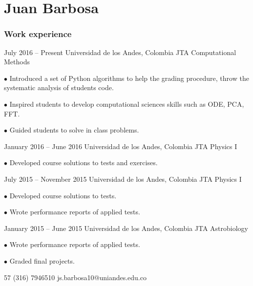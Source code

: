 \documentclass{tccv}
\begin{document}
\part{Juan Barbosa}

\section{Work experience}

\begin{eventlist}
\item{July 2016 -- Present}
     {Universidad de los Andes, Colombia}
     {JTA Computational Methods}
     
     \setlength{\leftskip}{0.5cm}
	     $\bullet$ \hspace{0.2cm} Introduced a set of Python algorithms to help the grading procedure, throw the systematic analysis of students code.
	     
	     $\bullet$ \hspace{0.2cm} Inspired students to develop computational sciences skills such as ODE, PCA, FFT.
     
	     $\bullet$ \hspace{0.2cm} Guided students to solve in class problems.
	     
	     \hrulefill
     \setlength{\leftskip}{0pt}   
	 
\item{January 2016 -- June 2016}
     {Universidad de los Andes, Colombia}
     {JTA Physics I}

	 \setlength{\leftskip}{0.5cm}
		 $\bullet$ \hspace{0.2cm} Developed course solutions to tests and exercises.
		 
		 \hrulefill
	 \setlength{\leftskip}{0pt} 

\item{July 2015 -- November 2015}
     {Universidad de los Andes, Colombia}
     {JTA Physics I}
     
	 \setlength{\leftskip}{0.5cm}
		 $\bullet$ \hspace{0.2cm} Developed course solutions to tests.
		 
		 $\bullet$ \hspace{0.2cm} Wrote performance reports of applied tests.
		 
		 \hrulefill
	 \setlength{\leftskip}{0pt}

\item{January 2015 -- June 2015}
     {Universidad de los Andes, Colombia}
     {JTA Astrobiology}
     
     \setlength{\leftskip}{0.5cm}     
	     $\bullet$ \hspace{0.2cm} Wrote performance reports of applied tests.
	     
	     $\bullet$ \hspace{0.2cm} Graded final projects.
     
	     \hrulefill
     \setlength{\leftskip}{0pt}
\end{eventlist}
\pagebreak
{}
    {57 (316) 7946510}
    {js.barbosa10@uniandes.edu.co}
\end{document}
